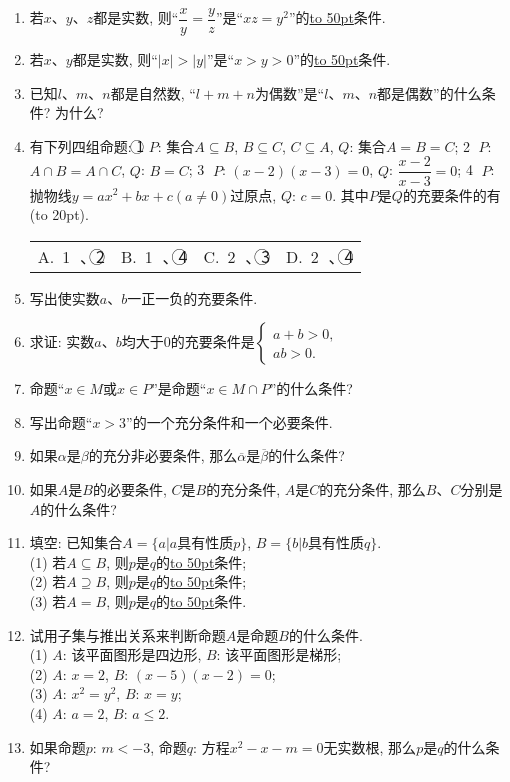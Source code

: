 \documentclass[10pt,a4paper]{article}
\newcommand{\blank}[1]{\underline{\hbox to #1pt{}}}
\newcommand{\bracket}[1]{(\hbox to #1pt{})}
\newcommand{\fourch}[4]{\par\begin{tabular}{p{.23\textwidth}p{.23\textwidth}p{.23\textwidth}p{.23\textwidth}}
A.~#1 &B.~#2& C.~#3& D.~#4
\end{tabular}}
\begin{document}
\begin{enumerate}[1.]
\item 若$x$、$y$、$z$都是实数, 则``$\dfrac xy=\dfrac yz$''是``$xz=y^2$''的\blank{50}条件.
\item 若$x$、$y$都是实数, 则``$|x|>|y|$''是``$x>y>0$''的\blank{50}条件.
\item 已知$l$、$m$、$n$都是自然数, ``$l+m+n$为偶数''是``$l$、$m$、$n$都是偶数''的什么条件? 为什么?
\item 有下列四组命题:
\textcircled{1} $P$: 集合$A\subseteq B$, $B\subseteq C$, $C\subseteq A$, 		$Q$: 集合$A=B=C$;
\textcircled{2} $P$: $A\cap B=A\cap C$, 					$Q$: $B=C$;
\textcircled{3} $P$: $(x-2)(x-3)=0$, 				$Q$: $\dfrac{x-2}{x-3}=0$;
\textcircled{4} $P$: 抛物线$y=ax^2+bx+c(a\ne 0)$过原点, $Q$: $c=0$.
其中$P$是$Q$的充要条件的有\bracket{20}.
\fourch{\textcircled{1} 、\textcircled{2} }{\textcircled{1} 、\textcircled{4} }{\textcircled{2} 、\textcircled{3} }{\textcircled{2} 、\textcircled{4}}
\item 写出使实数$a$、$b$一正一负的充要条件.
\item 求证: 实数$a$、$b$均大于0的充要条件是$\begin{cases} a+b>0, \\ ab>0. \end{cases}$
\item 命题``$x\in M$或$x\in P$''是命题``$x\in M\cap P$''的什么条件?
\item 写出命题``$x>3$''的一个充分条件和一个必要条件.
\item 如果$\alpha$是$\beta$的充分非必要条件, 那么$\overline{\alpha }$是$\overline{\beta }$的什么条件?
\item 如果$A$是$B$的必要条件, $C$是$B$的充分条件, $A$是$C$的充分条件, 那么$B$、$C$分别是$A$的什么条件?
\item 填空:
已知集合$A=\{a|a$具有性质$p\}$, $B=\{b|b$具有性质$q\}$.\\
(1) 若$A\subseteq B$, 则$p$是$q$的\blank{50}条件;\\
(2) 若$A\supseteq B$, 则$p$是$q$的\blank{50}条件;\\
(3) 若$A=B$, 则$p$是$q$的\blank{50}条件.
\item 试用子集与推出关系来判断命题$A$是命题$B$的什么条件.\\
(1) $A$: 该平面图形是四边形, $B$: 该平面图形是梯形;\\
(2) $A$: $x=2$, $B$: $(x-5)(x-2)=0$;\\
(3) $A$: $x^2=y^2$, $B$: $x=y$;\\
(4) $A$: $a=2$, $B$: $a\le 2$.
\item 如果命题$p$: $m<-3$, 命题$q$: 方程$x^2-x-m=0$无实数根, 那么$p$是$q$的什么条件?

\end{enumerate}
\end{document}
